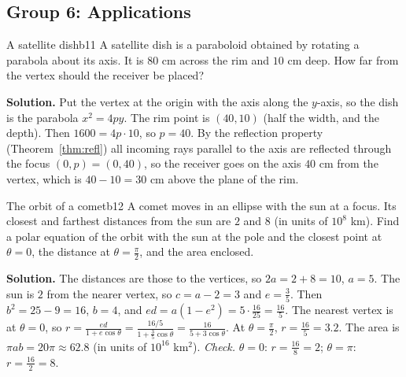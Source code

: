 \documentclass[11pt]{article}
\begin{document}
\subsection*{Group 6: Applications}

\begin{exmp}{A satellite dish}{b11}
A satellite dish is a paraboloid obtained by rotating a parabola about its axis. It is $80$ cm across the rim and $10$ cm deep. How far from the vertex should the receiver be placed?

\textbf{Solution.} Put the vertex at the origin with the axis along the $y$-axis, so the dish is the parabola $x^2=4py$. The rim point is $(40,10)$ (half the width, and the depth). Then $1600=4p\cdot10$, so $p=40$. By the reflection property (Theorem~\ref{thm:refl}) all incoming rays parallel to the axis are reflected through the focus $(0,p)=(0,40)$, so the receiver goes on the axis $40$ cm from the vertex, which is $40-10=30$ cm above the plane of the rim.
\end{exmp}

\begin{exmp}{The orbit of a comet}{b12}
A comet moves in an ellipse with the sun at a focus. Its closest and farthest distances from the sun are $2$ and $8$ (in units of $10^8$ km). Find a polar equation of the orbit with the sun at the pole and the closest point at $\theta=0$, the distance at $\theta=\frac\pi2$, and the area enclosed.

\textbf{Solution.} The distances are those to the vertices, so $2a=2+8=10$, $a=5$. The sun is $2$ from the nearer vertex, so $c=a-2=3$ and $e=\frac35$. Then $b^2=25-9=16$, $b=4$, and $ed=a\left(1-e^2\right)=5\cdot\frac{16}{25}=\frac{16}5$. The nearest vertex is at $\theta=0$, so $r=\frac{ed}{1+e\cos\theta}=\frac{16/5}{1+\frac35\cos\theta}=\frac{16}{5+3\cos\theta}$. At $\theta=\frac\pi2$, $r=\frac{16}5=3.2$. The area is $\pi ab=20\pi\approx62.8$ (in units of $10^{16}$ km$^2$).
\emph{Check.} $\theta=0$: $r=\frac{16}8=2$; $\theta=\pi$: $r=\frac{16}2=8$.
\end{exmp}
\end{document}
